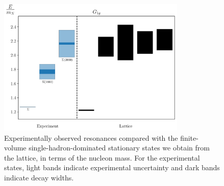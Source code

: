 \begin{figure}[H]
    \centering
    \includegraphics[width=0.8\textwidth]{figures/sigmas/g1g/expvslat.pdf}
    \caption{Experimentally observed resonances compared with the finite-volume single-hadron-dominated stationary states we obtain from the lattice, in terms of the nucleon mass. For the experimental states, light bands indicate experimental uncertainty and dark bands indicate decay widths.}\label{fig:g1g_exp}
\end{figure}

